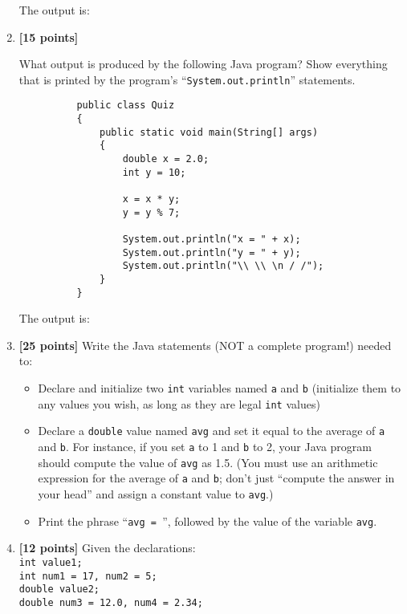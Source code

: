 \begin{enumerate}
\vspace*{-.175in}
The output is: \mbox{\underline{\hspace{3in}}}
\item {\bf [15 points]}

What output is produced by the following Java program? Show everything that
is printed by the program's ``{\tt System.out.println}'' statements.
\begin{verbatim}
          public class Quiz
          {
              public static void main(String[] args)
              {
                  double x = 2.0;
                  int y = 10;
          
                  x = x * y;
                  y = y % 7;
          
                  System.out.println("x = " + x);
                  System.out.println("y = " + y);
                  System.out.println("\\ \\ \n / /");
              }
          }
\end{verbatim}
\vspace*{-.05in}
The output is:
\vspace{1in}

\item {\bf [25 points]}
Write the Java statements (NOT a complete program!) needed to:
\begin{itemize}
\item
Declare and initialize two {\tt int} variables named {\tt a} and {\tt b}
(initialize them to any values you wish, as long as they
are legal {\tt int} values)
\item
Declare a {\tt double} value named {\tt avg} and set it equal to the
average of {\tt a} and {\tt b}. For instance, if you set {\tt a} to 1 and
{\tt b} to 2, your Java program should compute the value of {\tt avg} as
1.5. (You must use an arithmetic expression for the 
average of {\tt a} and {\tt b}; don't
just ``compute the answer in your head'' and assign a constant value to {\tt avg}.)
\item
Print the phrase ``\verb$avg = $'', followed by the value of the variable 
{\tt avg}.
\end{itemize}

\vspace{3.5in}

\item {\bf [12 points]}
Given the declarations:\\

{\tt int value1;}\\
{\tt int num1 = 17, num2 = 5;}\\
{\tt double value2;}\\
{\tt double num3 = 12.0, num4 = 2.34;}\\ 


\end{enumerate}
